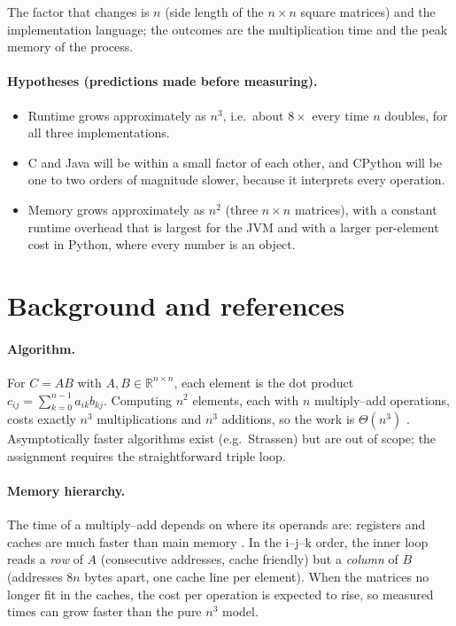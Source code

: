 \documentclass[11pt,a4paper]{article}
\begin{document}
The factor that changes is $n$ (side length of the $n\times n$ square matrices) and the
implementation language; the outcomes are the multiplication time and the peak memory
of the process.

\paragraph{Hypotheses (predictions made before measuring).}
\begin{itemize}
  \item[H1] Runtime grows approximately as $n^3$, i.e.\ about $8\times$ every time
        $n$ doubles, for all three implementations.
  \item[H2] C and Java will be within a small factor of each other, and CPython will be
        one to two orders of magnitude slower, because it interprets every operation.
  \item[H3] Memory grows approximately as $n^2$ (three $n\times n$ matrices), with a
        constant runtime overhead that is largest for the JVM and with a larger
        per-element cost in Python, where every number is an object.
\end{itemize}

\section{Background and references}

\paragraph{Algorithm.} For $C = AB$ with $A, B \in \mathbb{R}^{n\times n}$, each element
is the dot product $c_{ij} = \sum_{k=0}^{n-1} a_{ik} b_{kj}$. Computing $n^2$ elements,
each with $n$ multiply--add operations, costs exactly $n^3$ multiplications and $n^3$
additions, so the work is $\Theta(n^3)$ \cite{golub}. Asymptotically faster algorithms
exist (e.g.\ Strassen) but are out of scope; the assignment requires the straightforward
triple loop.

\paragraph{Memory hierarchy.} The time of a multiply--add depends on where its operands
are: registers and caches are much faster than main memory \cite{drepper}. In the i--j--k
order, the inner loop reads a \emph{row} of $A$ (consecutive addresses, cache friendly)
but a \emph{column} of $B$ (addresses $8n$ bytes apart, one cache line per element).
When the matrices no longer fit in the caches, the cost per operation is expected to rise,
so measured times can grow faster than the pure $n^3$ model.
\end{document}
